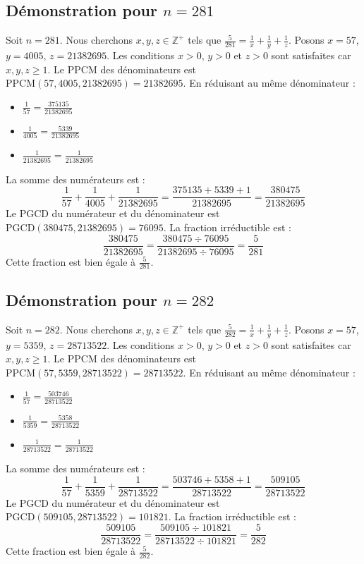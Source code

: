\documentclass[11pt,a4paper]{article}
\begin{document}
\subsection{Démonstration pour $n = 281$}
Soit $n = 281$. Nous cherchons $x, y, z \in \mathbb{Z}^{+}$ tels que $\frac{5}{281} = \frac{1}{x} + \frac{1}{y} + \frac{1}{z}$.
Posons $x = 57$, $y = 4005$, $z = 21382695$.
Les conditions $x > 0$, $y > 0$ et $z > 0$ sont satisfaites car $x, y, z \geq 1$.
Le PPCM des dénominateurs est $\text{PPCM}(57, 4005, 21382695) = 21382695$.
En réduisant au même dénominateur :
\begin{itemize}
    \item $\frac{1}{57} = \frac{375135}{21382695}$
    \item $\frac{1}{4005} = \frac{5339}{21382695}$
    \item $\frac{1}{21382695} = \frac{1}{21382695}$
\end{itemize}
La somme des numérateurs est :
$$ \frac{1}{57} + \frac{1}{4005} + \frac{1}{21382695} = \frac{375135 + 5339 + 1}{21382695} = \frac{380475}{21382695} $$
Le PGCD du numérateur et du dénominateur est $\text{PGCD}(380475, 21382695) = 76095$.
La fraction irréductible est :
$$ \frac{380475}{21382695} = \frac{380475 \div 76095}{21382695 \div 76095} = \frac{5}{281} $$
Cette fraction est bien égale à $\frac{5}{281}$.

\subsection{Démonstration pour $n = 282$}
Soit $n = 282$. Nous cherchons $x, y, z \in \mathbb{Z}^{+}$ tels que $\frac{5}{282} = \frac{1}{x} + \frac{1}{y} + \frac{1}{z}$.
Posons $x = 57$, $y = 5359$, $z = 28713522$.
Les conditions $x > 0$, $y > 0$ et $z > 0$ sont satisfaites car $x, y, z \geq 1$.
Le PPCM des dénominateurs est $\text{PPCM}(57, 5359, 28713522) = 28713522$.
En réduisant au même dénominateur :
\begin{itemize}
    \item $\frac{1}{57} = \frac{503746}{28713522}$
    \item $\frac{1}{5359} = \frac{5358}{28713522}$
    \item $\frac{1}{28713522} = \frac{1}{28713522}$
\end{itemize}
La somme des numérateurs est :
$$ \frac{1}{57} + \frac{1}{5359} + \frac{1}{28713522} = \frac{503746 + 5358 + 1}{28713522} = \frac{509105}{28713522} $$
Le PGCD du numérateur et du dénominateur est $\text{PGCD}(509105, 28713522) = 101821$.
La fraction irréductible est :
$$ \frac{509105}{28713522} = \frac{509105 \div 101821}{28713522 \div 101821} = \frac{5}{282} $$
Cette fraction est bien égale à $\frac{5}{282}$.
\end{document}
